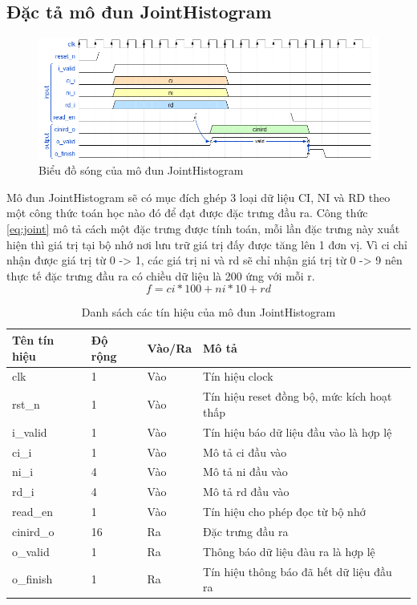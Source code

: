\subsection{Đặc tả mô đun JointHistogram}

\begin{figure}[H]
    \centering
    \includegraphics[width=\linewidth]{figures/jointHistogram.png}
    \caption{Biểu đồ sóng của mô đun JointHistogram}
    \label{fig:jointHistogram}
\end{figure}
Mô đun JointHistogram sẽ có mục đích ghép 3 loại dữ liệu CI, NI và RD theo một công thức toán học nào đó để đạt được đặc trưng đầu ra. Công thức \ref{eq:joint} mô tả cách một đặc trưng được tính toán, mỗi lần đặc trưng này xuất hiện thì giá trị tại bộ nhớ nơi lưu trữ giá trị đấy được tăng lên 1 đơn vị. Vì ci chỉ nhận được giá trị từ 0 -> 1, các giá trị ni và rd sẽ chỉ nhận giá trị từ 0 -> 9 nên thực tế đặc trưng đầu ra có chiều dữ liệu là 200 ứng với mỗi r.
\begin{equation}
    f = ci*100 + ni*10 + rd
    \label{eq:joint}
\end{equation}
\begin{table}[!ht]
    \centering
    \renewcommand{\arraystretch}{1.3} %
    \begin{tabular}{|p{3cm} p{2cm} p{2cm} p{8cm}|}
        \hline
        \rowcolor{gray!30}
        \textbf{Tên tín hiệu} & \textbf{Độ rộng} & \textbf{Vào/Ra} & \textbf{Mô tả} \\
        \hline
        clk & 1 & Vào & Tín hiệu clock \\
        \hline
        rst\_n & 1 & Vào & Tín hiệu reset đồng bộ, mức kích hoạt thấp \\
        \hline
        i\_valid & 1 & Vào & Tín hiệu báo dữ liệu đầu vào là hợp lệ \\
        \hline
        ci\_i & 1 & Vào & Mô tả ci đầu vào
        \\ \hline
        ni\_i & 4 & Vào & Mô tả ni đầu vào
        \\ \hline
        rd\_i & 4 & Vào & Mô tả rd đầu vào
        \\ \hline
        read\_en & 1 & Vào & Tín hiệu cho phép đọc từ bộ nhớ
        \\ \hline
        cinird\_o & 16 & Ra & Đặc trưng đầu ra
        \\ \hline
        o\_valid & 1 & Ra & Thông báo dữ liệu đàu ra là hợp lệ
        \\ \hline
        o\_finish & 1 & Ra & Tín hiệu thông báo đã hết dữ liệu đầu ra
        \\
        \hline
    \end{tabular}
    \caption{Danh sách các tín hiệu của mô đun JointHistogram}
    \label{tab:signalListJointHistogram}
\end{table}